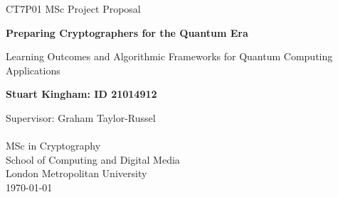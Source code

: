 \documentclass[11pt,a4paper]{article}
\author{\myauthor: ID \myid}
\title{\mytitle}
\date{\today}
\newcommand{\mytitle}{Preparing Cryptographers for the Quantum Era}
\newcommand{\mysubtitle}{Learning Outcomes and Algorithmic Frameworks for Quantum Computing Applications}
\newcommand{\myauthor}{Stuart Kingham}
\newcommand{\myid}{21014912}
\begin{document}
\doublespacing



\begin{titlepage}
  \vspace*{\fill}
  \begin{center}
       \vspace*{1cm}

       {\LARGE CT7P01 MSc Project Proposal}

       \vspace*{1cm}
       {\large \textbf{\mytitle}}
       
       \vspace{0.2cm}
       {\large \mysubtitle}
            

       \vfill

       \textbf{\myauthor : ID \myid}

       \vfill
                        
       \vspace{0.8cm}
     

       Supervisor: Graham Taylor-Russel \\
       \\
       MSc in Cryptography \\
       School of Computing and Digital Media\\
       London Metropolitan University\\
       \today
            
  \end{center}
  \vspace*{\fill}
\end{titlepage}


\pagebreak

\newpage

\singlespacing 
\tableofcontents
\listoffigures
\doublespacing

\newpage
\end{document}
